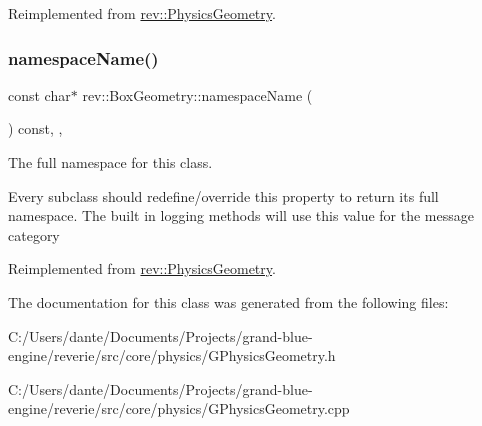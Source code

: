 Reimplemented from \mbox{\hyperlink{classrev_1_1_physics_geometry_afc74d4c03367f3bc83595acaeca7d9a8}{rev\+::\+Physics\+Geometry}}.

\mbox{\label{classrev_1_1_box_geometry_a2a3b42da46821366322cfecf569e2b5f}} 
\subsubsection{\texorpdfstring{namespaceName()}{namespaceName()}}
{\footnotesize\ttfamily const char$\ast$ rev\+::\+Box\+Geometry\+::namespace\+Name (\begin{DoxyParamCaption}{ }\end{DoxyParamCaption}) const\hspace{0.3cm}{\ttfamily [inline]}, {\ttfamily [override]}, {\ttfamily [virtual]}}



The full namespace for this class. 

Every subclass should redefine/override this property to return its full namespace. The built in logging methods will use this value for the message category 

Reimplemented from \mbox{\hyperlink{classrev_1_1_physics_geometry_ad4311205e1a6eabeeb7773a01d11add5}{rev\+::\+Physics\+Geometry}}.



The documentation for this class was generated from the following files\+:\begin{DoxyCompactItemize}
\item 
C\+:/\+Users/dante/\+Documents/\+Projects/grand-\/blue-\/engine/reverie/src/core/physics/G\+Physics\+Geometry.\+h\item 
C\+:/\+Users/dante/\+Documents/\+Projects/grand-\/blue-\/engine/reverie/src/core/physics/G\+Physics\+Geometry.\+cpp\end{DoxyCompactItemize}
